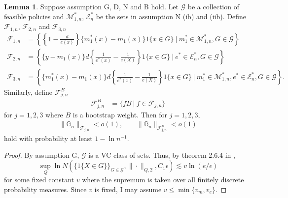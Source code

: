 \documentclass[12pt,oneside,reqno,english]{amsart}
\theoremstyle{definition}
\newtheorem{lemma}{Lemma}
\begin{document}
\begin{lemma}\label{l:residual}
Suppose assumption G, D, N and B hold.
Let $\mathcal{G}$ be a collection of feasible policies and $\mathcal{M}^{*}_{1,n}$, $\mathcal{E}^{*}_{n}$ be the sets in assumption N (ib) and (iib). 
Define $\mathcal{F}_{1,n}$, $\mathcal{F}_{2,n}$ and $\mathcal{F}_{3,n}$ 
\begin{align*}
\mathcal{F}_{1,n}&=\left\{\left\{1-\frac{d}{e(x)}\right\}\{m_{1}^{*}(x)-m_{1}(x)\}1\{x\in G\}\ | \ m_{1}^{*}\in \mathcal{M}^{*}_{1,n}, G\in \mathcal{G}\right\}\\
\mathcal{F}_{2,n}&=\left\{\{y-m_{1}(x)\}d\left\{\frac{1}{e^{*}(x)}-\frac{1}{e(X)}\right\}1\{x\in G\} \ |\ e^{*}\in \mathcal{E}^{*}_{n},G\in \mathcal{G}\right\}\\
\mathcal{F}_{3,n}&=\left\{\{m_{1}^{*}(x)-m_{1}(x)\}d\left\{\frac{1}{e^{*}(x)}-\frac{1}{e(X)}\right\}1\{x\in G\} \ | \ m_{1}^{*}\in \mathcal{M}^{*}_{1,n}, 
e^{*}\in \mathcal{E}^{*}_{n},G\in \mathcal{G}\right\}.
\end{align*}
Similarly, define $\mathcal{F}^{B}_{j,n}$ 
\begin{align*}
\mathcal{F}_{j,n}^{B}&=\{ fB\ | \ f\in \mathcal{F}_{j,n}\}
\end{align*}
for $j= 1,2,3$ where $B$ is a bootstrap weight.  Then for $j=1,2,3,$
\begin{align*}
\|\mathbb{G}_{n}\|_{\mathcal{F}_{j,n}}<o(1), \qquad \|\mathbb{G}_{n}\|_{\mathcal{F}_{j,n}^{B}}<o(1)  
\end{align*}
hold with probability at least $1-\ln n^{-1}$. 
\begin{proof}
By assumption G, $\mathcal{G}$ is a VC class of sets. Thus, by theorem 2.6.4 in \cite{VW:96}, 
\[\sup_{Q}\ln N(\{1\{X\in G\}\}_{G\in \mathcal{G}},\|\cdot\|_{Q,2},C_{1}\epsilon)\lesssim  v\ln(e/\epsilon)\]
for some fixed constant $v$ where the supremum is taken over all finitely discrete probability measures.
Since $v$ is fixed, I may assume $v\leq \min\{v_{m},v_{e}\}$. 


\end{proof}
\end{lemma}
\end{document}

